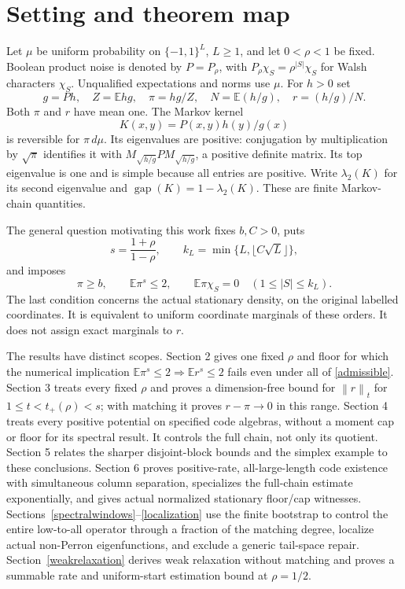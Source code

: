 \documentclass[11pt]{article}
\newcommand{\E}{\mathbb E}
\newcommand{\norm}[1]{\left\|#1\right\|}
\begin{document}
\section{Setting and theorem map}
Let $\mu$ be uniform probability on $\{-1,1\}^L$, $L\geq1$, and let $0<\rho<1$ be fixed. Boolean product noise is denoted by $P=P_\rho$, with $P_\rho\chi_S=\rho^{|S|}\chi_S$ for Walsh characters $\chi_S$. Unqualified expectations and norms use $\mu$. For $h>0$ set
\[
 g=Ph,\quad Z=\E hg,\quad \pi=hg/Z,\quad
 N=\E(h/g),\quad r=(h/g)/N.
\]
Both $\pi$ and $r$ have mean one. The Markov kernel
\[
 K(x,y)=P(x,y)h(y)/g(x)
\]
is reversible for $\pi\,d\mu$. Its eigenvalues are positive: conjugation by multiplication by $\sqrt\pi$ identifies it with
$M_{\sqrt{h/g}}P M_{\sqrt{h/g}}$, a positive definite matrix. Its top eigenvalue is one and is simple because all entries are positive. Write $\lambda_2(K)$ for its second eigenvalue and $\operatorname{gap}(K)=1-\lambda_2(K)$. These are finite Markov-chain quantities.

The general question motivating this work fixes $b,C>0$, puts
\[
 s=\frac{1+\rho}{1-\rho},\qquad k_L=\min\{L,\lfloor C\sqrt L\rfloor\},
\]
and imposes
\begin{equation}\label{admissible}
 \pi\geq b,\qquad \E\pi^s\leq2,\qquad
 \E\pi\chi_S=0\quad(1\leq |S|\leq k_L).
\end{equation}
The last condition concerns the actual stationary density, on the original labelled coordinates. It is equivalent to uniform coordinate marginals of these orders. It does not assign exact marginals to $r$.

The results have distinct scopes. Section 2 gives one fixed $\rho$ and floor for which the numerical implication $\E\pi^s\leq2\Rightarrow\E r^s\leq2$ fails even under all of \eqref{admissible}. Section 3 treats every fixed $\rho$ and proves a dimension-free bound for $\norm r_t$ for $1\leq t<t_+(\rho)<s$; with matching it proves $r-\pi\to0$ in this range. Section 4 treats every positive potential on specified code algebras, without a moment cap or floor for its spectral result. It controls the full chain, not only its quotient. Section 5 relates the sharper disjoint-block bounds and the simplex example to these conclusions. Section 6 proves positive-rate, all-large-length code existence with simultaneous column separation, specializes the full-chain estimate exponentially, and gives actual normalized stationary floor/cap witnesses. Sections~\ref{spectralwindows}--\ref{localization} use the finite bootstrap to control the entire low-to-all operator through a fraction of the matching degree, localize actual non-Perron eigenfunctions, and exclude a generic tail-space repair. Section~\ref{weakrelaxation} derives weak relaxation without matching and proves a summable rate and uniform-start estimation bound at $\rho=1/2$.
\end{document}
